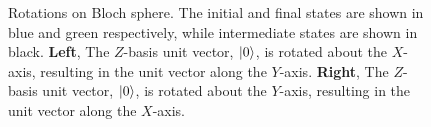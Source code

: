 \begin{figure}
    \begin{center}
        \qquad
    \end{center}
    \caption[Rotations on Bloch sphere]{
        Rotations on Bloch sphere. 
        The initial and final states are shown in blue and green respectively, while intermediate states are shown in black. 
        \textbf{Left}, The $Z$-basis unit vector, $\ket{0}$, is rotated about the $X$-axis, resulting in the unit vector along the $Y$-axis. 
        \textbf{Right}, The $Z$-basis unit vector, $\ket{0}$, is rotated about the $Y$-axis, resulting in the unit vector along the $X$-axis. 
    }
    \label{fig:bloch_rotations}
\end{figure}
\par 


